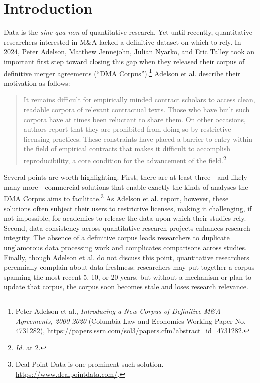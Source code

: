 \documentclass[12pt]{article}
\begin{document}
\section{Introduction}
Data is the \emph{sine qua non} of quantitative research. Yet until recently, quantitative researchers interested in M\&A lacked a definitive dataset on which to rely. In 2024, Peter Adelson, Matthew Jennejohn, Julian Nyarko, and Eric Talley took an important first step toward closing this gap when they released their corpus of definitive merger agreements (“DMA Corpus”).\footnote{Peter Adelson et al., \emph{Introducing a New Corpus of Definitive M\&A Agreements, 2000-2020} (Columbia Law and Economics Working Paper No. 4731282), \url{https://papers.ssrn.com/sol3/papers.cfm?abstract_id=4731282}.} Adelson et al. describe their motivation as follows:

\begingroup
\singlespacing
\begin{quote}
It remains difficult for empirically minded contract scholars to access clean, readable corpora of relevant contractual texts. Those who have built such corpora have at times been reluctant to share them. On other occasions, authors report that they are prohibited from doing so by restrictive licensing practices. These constraints have placed a barrier to entry within the field of empirical contracts that makes it difficult to accomplish reproducibility, a core condition for the advancement of the field.\footnote{\emph{Id.} at 2.}
\end{quote}
\endgroup
\vspace{-1em}

Several points are worth highlighting. First, there are at least three—and likely many more—commercial solutions that enable exactly the kinds of analyses the DMA Corpus aims to facilitate.\footnote{Deal Point Data is one prominent such solution. \url{https://www.dealpointdata.com/}.}  As Adelson et al. report, however, these solutions often subject their users to restrictive licenses, making it challenging, if not impossible, for academics to release the data upon which their studies rely. Second, data consistency across quantitative research projects enhances research integrity. The absence of a definitive corpus leads researchers to duplicate unglamorous data processing work and complicates comparisons across studies. Finally, though Adelson et al. do not discuss this point, quantitative researchers perennially complain about data freshness: researchers may put together a corpus spanning the most recent 5, 10, or 20 years, but without a mechanism or plan to update that corpus, the corpus soon becomes stale and loses research relevance.
\end{document}
